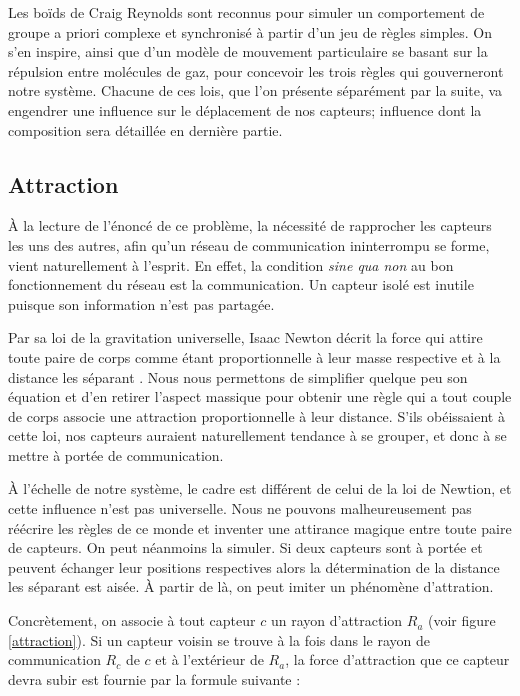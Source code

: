 \documentclass[10pt]{article}
\begin{document}
\begin{multicols}{2}
Les boïds de Craig Reynolds \cite{Reynolds1987} sont reconnus pour
simuler un comportement de groupe a priori complexe et synchronisé à
partir d'un jeu de règles simples. On s'en inspire, ainsi que d'un
modèle de mouvement particulaire \cite{Cheng2011497} se basant sur la
répulsion entre molécules de gaz, pour concevoir les trois règles qui
gouverneront notre système. Chacune de ces lois, que l'on présente
séparément par la suite, va engendrer une influence sur le déplacement
de nos capteurs; influence dont la composition sera détaillée en
dernière partie.

\subsection*{Attraction}

\`A la lecture de l'énoncé de ce problème, la nécessité de rapprocher
les capteurs les uns des autres, afin qu'un réseau de communication
ininterrompu se forme, vient naturellement à l'esprit. En effet, la
condition \textit{sine qua non} au bon fonctionnement du réseau est la
communication. Un capteur isolé est inutile puisque son
information n'est pas partagée.

Par sa loi de la gravitation universelle, Isaac Newton décrit la force
qui attire toute paire de corps comme étant proportionnelle à leur
masse respective et à la distance les séparant \cite{newton}. Nous
nous permettons de simplifier quelque peu son équation et d'en retirer
l'aspect massique pour obtenir une règle qui a tout couple de corps
associe une attraction proportionnelle à leur distance. S'ils
obéissaient à cette loi, nos capteurs auraient naturellement tendance
à se grouper, et donc à se mettre à portée de communication.

\`A l'échelle de notre système, le cadre est différent de celui de la
loi de Newtion, et cette influence n'est pas universelle. Nous ne
pouvons malheureusement pas réécrire les règles de ce monde et
inventer une attirance magique entre toute paire de capteurs. On peut
néanmoins la simuler. Si deux capteurs sont à portée et peuvent
échanger leur positions respectives alors la détermination de la
distance les séparant est aisée. \`A partir de là, on peut imiter un
phénomène d'attration.

Concrètement, on associe à tout capteur $c$ un rayon d'attraction
$R_a$ (voir figure \ref{attraction}). Si un capteur voisin se trouve à
la fois dans le rayon de communication $R_c$ de $c$ et à l'extérieur
de $R_a$, la force d'attraction que ce capteur devra subir est fournie
par la formule suivante :


\end{multicols}
\end{document}

